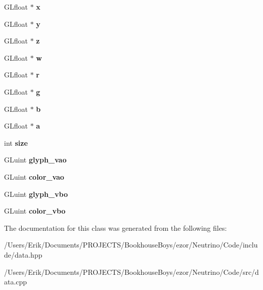 \begin{DoxyCompactItemize}
\item 
\mbox{\label{classtext4_a87cc17badf5fac03b0d17e8c09fe78e4}} 
G\+Lfloat $\ast$ {\bfseries x}
\item 
\mbox{\label{classtext4_a85b8f58eaf19a22a3f8feeae5dbe0f54}} 
G\+Lfloat $\ast$ {\bfseries y}
\item 
\mbox{\label{classtext4_a9d33e57ac43e3b6bb1e238ec2a704d20}} 
G\+Lfloat $\ast$ {\bfseries z}
\item 
\mbox{\label{classtext4_a05b5286669da7f43363a6ef6d8b10d25}} 
G\+Lfloat $\ast$ {\bfseries w}
\item 
\mbox{\label{classtext4_a85fea35b0ab63f662ec605880585c8a1}} 
G\+Lfloat $\ast$ {\bfseries r}
\item 
\mbox{\label{classtext4_a5047354c09fabb861942fda2389765ff}} 
G\+Lfloat $\ast$ {\bfseries g}
\item 
\mbox{\label{classtext4_a2f927842a7300ebdd14a287d8f38cf27}} 
G\+Lfloat $\ast$ {\bfseries b}
\item 
\mbox{\label{classtext4_ad36a6c224961ce5867b36e5fc101b8a5}} 
G\+Lfloat $\ast$ {\bfseries a}
\item 
\mbox{\label{classtext4_aa9d0db08dcc0d0937a7d004a130120cb}} 
int {\bfseries size}
\item 
\mbox{\label{classtext4_adef719ee5af94e33aa67d9c90fcf1b86}} 
G\+Luint {\bfseries glyph\+\_\+vao}
\item 
\mbox{\label{classtext4_a030d0cee6b1b68a2f0232d085594ebd5}} 
G\+Luint {\bfseries color\+\_\+vao}
\item 
\mbox{\label{classtext4_ad2a1c2059374e033f0e0f35a2c0411cf}} 
G\+Luint {\bfseries glyph\+\_\+vbo}
\item 
\mbox{\label{classtext4_a6feee08dc984e265d120dcfe19a3162a}} 
G\+Luint {\bfseries color\+\_\+vbo}
\end{DoxyCompactItemize}


The documentation for this class was generated from the following files\+:\begin{DoxyCompactItemize}
\item 
/\+Users/\+Erik/\+Documents/\+P\+R\+O\+J\+E\+C\+T\+S/\+Bookhouse\+Boys/ezor/\+Neutrino/\+Code/include/data.\+hpp\item 
/\+Users/\+Erik/\+Documents/\+P\+R\+O\+J\+E\+C\+T\+S/\+Bookhouse\+Boys/ezor/\+Neutrino/\+Code/src/data.\+cpp\end{DoxyCompactItemize}
